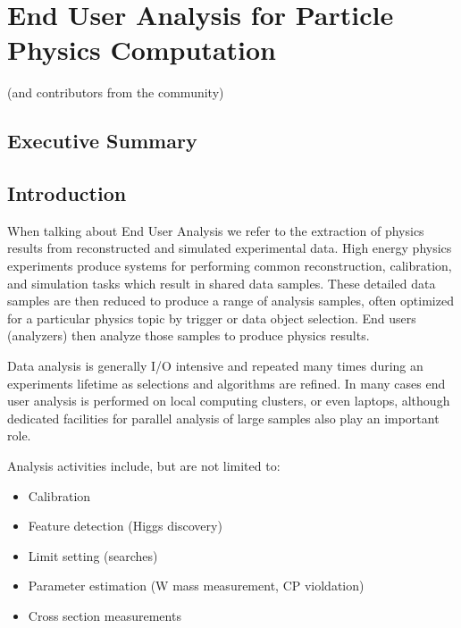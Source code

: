 
\setcounter{chapter}{4} 


\chapter{End User Analysis for Particle Physics Computation}

   {(and contributors from the community)}

\section{Executive Summary}

\section{Introduction}
When talking about End User Analysis we refer to the extraction of physics results from reconstructed and simulated experimental data. High energy physics experiments produce systems for performing common reconstruction, calibration, and simulation tasks which result in shared data samples. These detailed data samples are then reduced to produce a range of analysis samples, often optimized for a particular physics topic by trigger or data object selection. End users (analyzers) then analyze those samples to produce physics results.

Data analysis is generally I/O intensive and repeated many times during an experiments lifetime as selections and algorithms are refined. In many cases end user analysis is performed on local computing clusters, or even laptops, although dedicated facilities for parallel analysis of large samples also play an important role.

Analysis activities include, but are not limited to:
\begin{itemize}
  \item Calibration
  \item Feature detection (Higgs discovery)
  \item Limit setting (searches)
  \item Parameter estimation (W mass measurement, CP violdation)
  \item Cross section measurements
\end{itemize}

